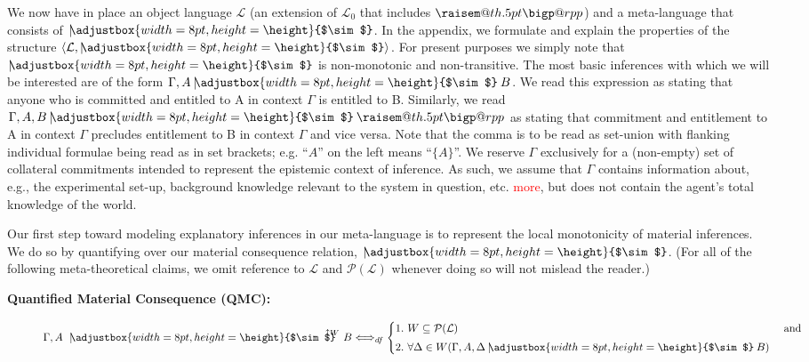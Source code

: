 \documentclass{svjour3}                     %
\makeatletter
\newcommand{\raisemath}[1]{\mathpalette{\raisem@th{#1}}}
\newcommand{\raisem@th}[3]{\raisebox{#1}{$#2#3$}}
\newcommand{\bigperpp}{%
  \mathop{\mathpalette\bigp@rpp\relax}%
  \displaylimits
}
\newcommand{\bigp@rpp}[2]{%
  \vcenter{
    \m@th\hbox{\scalebox{\ifx#1\displaystyle1.3\else1.3\fi}{$#1\perp$}}
  }%
}
\newcommand{\bigperp}{\raisemath{.5pt}{\bigperpp}}
\newcommand{\ssim}{%
     \setbox0=\hbox{$\sim$}%
     \adjustbox{width=8pt,height=\height}{$\sim$}
}
\newcommand{\uuparrow}{%
     \setbox0=\hbox{$\scriptstyle\uparrow$}%
     \raisebox{.2ex}{$\scriptstyle\uparrow$}
}
\newcommand{\nmc}{\mathbin{\mid\joinrel\!\!\ssim}}
\newcommand{\qmc}[4][\Gamma,]{{#1#2\,\,\mathrel{\nmc}}^{\!\!\!\!\!\!\!\uuparrow\scriptstyle #4}\,\,#3}
\makeatother
\begin{document}
We now have in place an object language $ \mathcal{L} $ (an extension of  $ \mathcal{L}_0 $ that includes $ \bigperp $) and a meta-language that consists of $ \nmc $.  In the appendix, we formulate and explain the properties of the structure $ \langle \mathcal{L}, \nmc \rangle  $. For present purposes we simply note that $ \nmc $ is non-monotonic and non-transitive.  The most basic inferences with which we will be interested are of the form $ \Gamma, A \nmc B $.  We read this expression as stating that anyone who is committed and entitled to A in context $ \Gamma $ is entitled to B. Similarly, we read  $\Gamma, A, B \nmc \bigperp $ as stating that commitment and entitlement to A in context $ \Gamma $ precludes entitlement to B in context $ \Gamma $ and vice versa. Note that the comma is to be read as set-union with flanking individual formulae being read as in set brackets; e.g. ``$ A $'' on the left means ``$ \{ A\} $''.  We reserve $ \Gamma $ exclusively for a (non-empty) set of collateral commitments intended to represent the epistemic context of inference. As such, we assume that $ \Gamma $ contains information about, e.g., the experimental set-up, background knowledge relevant to the system in question, etc. \textcolor{red}{more}, but does not contain the agent's total knowledge of the world. 

Our first step toward modeling explanatory inferences in our meta-language is to represent the local monotonicity of material inferences. We do so by quantifying over our material consequence relation, $ \nmc $.   (For all of the following meta-theoretical claims, we omit reference to $\mathcal{L}$ and $\mathcal{P}(\mathcal{L})$ whenever doing so will not mislead the reader.)

	\begin{description}
		\item[\textbf{Quantified Material Consequence (QMC):}]
		\begin{equation}
              \qmc{A}{B}{W} \Longleftrightarrow_{df}
				      \begin{cases}\nonumber
				        1.\,\, W\subseteq\mathcal{P}(\mathcal{L}) & $ and $ \\[3pt] 
						2.\,\, \forall\Delta\in W(\Gamma, A,  \Delta \nmc B ) 
						\end{cases}
		\end{equation}
		
	\end{description}  
	
\end{document}
